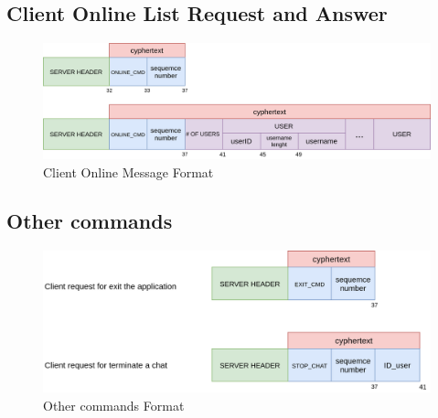 \documentclass[11pt]{report}
\begin{document}
\subsection*{Client Online List Request and Answer }
\begin{figure}[H]
	\centering
	\includegraphics[scale=0.25]{img/ClientOnline_messageFormat.png}
	\caption{Client Online Message Format}
	\label {img: FormatClientOnline}
\end{figure}
\subsection*{Other commands}
\begin{figure}[H]
	\centering
	\includegraphics[scale=0.28]{img/OthersCommandsFormat.png}
	\caption{Other commands Format}
	\label {img: FormatOtherCommands}
\end{figure}
\end{document}
